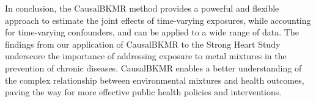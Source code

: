 In conclusion, the CausalBKMR method provides a powerful and flexible approach to estimate the joint effects of time-varying exposures, while accounting for time-varying confounders, and can be applied to a wide range of data. The findings from our application of CausalBKMR to the Strong Heart Study underscore the importance of addressing exposure to metal mixtures in the prevention of chronic diseases. CausalBKMR enables a better understanding of the complex relationship between environmental mixtures and health outcomes, paving the way for more effective public health policies and interventions.
